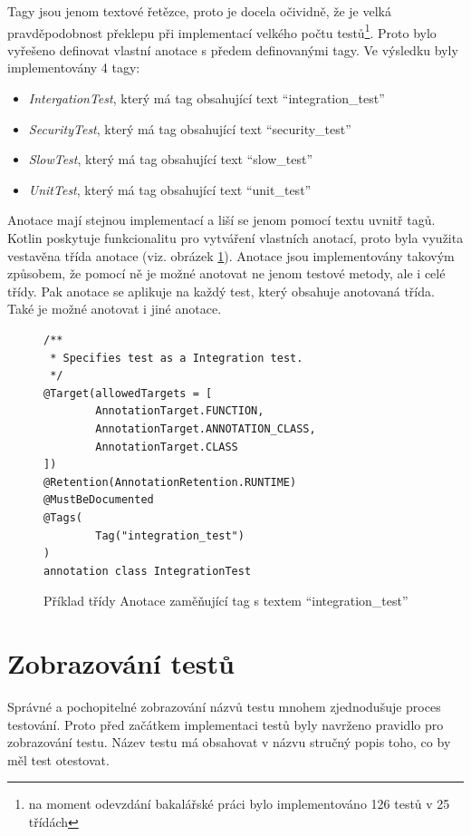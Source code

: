     Tagy jsou jenom textové řetězce, proto je docela očividně, že je velká pravděpodobnost překlepu při implementací velkého počtu testů\footnote{na moment odevzdání bakalářské práci bylo implementováno 126 testů v 25 třídách}. Proto bylo vyřešeno definovat vlastní anotace s předem definovanými tagy. Ve výsledku byly implementovány 4 tagy:
    \begin{itemize}
            \item \textit{IntergationTest}, který má tag obsahující text \enquote{integration\_test}
            \item \textit{SecurityTest}, který má tag obsahující text \enquote{security\_test}
            \item \textit{SlowTest}, který má tag obsahující text \enquote{slow\_test}
            \item \textit{UnitTest}, který má tag obsahující text \enquote{unit\_test}
    \end{itemize}
    
    Anotace mají stejnou implementací a liší se jenom pomocí textu uvnitř tagů. Kotlin poskytuje funkcionalitu pro vytváření vlastních anotací, proto byla využita vestavěna třída anotace (viz. obrázek \ref{code:annotation-class}). Anotace jsou implementovány takovým způsobem, že pomocí ně je možné anotovat ne jenom testové metody, ale i celé třídy. Pak anotace se aplikuje na každý test, který obsahuje anotovaná třída. Také je možné anotovat i jiné anotace.
    \begin{figure}
        \begin{verbatim}
/**
 * Specifies test as a Integration test.
 */
@Target(allowedTargets = [
        AnnotationTarget.FUNCTION,
        AnnotationTarget.ANNOTATION_CLASS,
        AnnotationTarget.CLASS
])
@Retention(AnnotationRetention.RUNTIME)
@MustBeDocumented
@Tags(
        Tag("integration_test")
)
annotation class IntegrationTest
        \end{verbatim}
        \caption{Příklad třídy Anotace zaměňující tag s textem \enquote{integration\_test}} 
        \label{code:annotation-class}
    \end{figure}
\section{Zobrazování testů}\label{testovani:zobrazovani}
    Správné a pochopitelné zobrazování názvů testu mnohem zjednodušuje proces testování. Proto před začátkem implementaci testů byly navrženo pravidlo pro zobrazování testu. Název testu má obsahovat v názvu stručný popis toho, co by měl test otestovat. 
    
